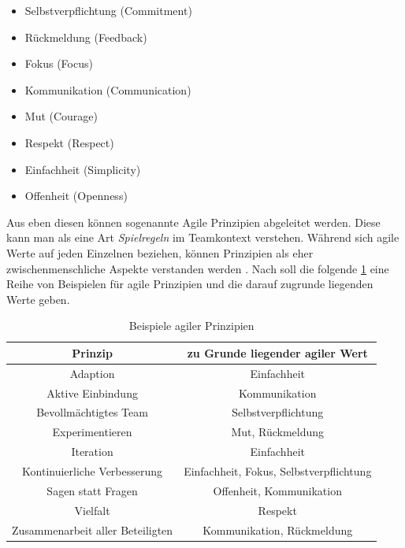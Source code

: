 \begin{itemize}[noitemsep, topsep=0pt]
	\item Selbstverpflichtung (Commitment)
	\item Rückmeldung (Feedback)
	\item Fokus (Focus)
	\item Kommunikation (Communication) 
	\item Mut (Courage)
	\item Respekt (Respect)
	\item Einfachheit (Simplicity)
	\item Offenheit (Openness)
\end{itemize}

Aus eben diesen können sogenannte Agile Prinzipien abgeleitet werden. Diese kann man als eine Art \textit{Spielregeln} im Teamkontext verstehen. Während sich agile Werte auf jeden Einzelnen beziehen, können Prinzipien als eher zwischenmenschliche Aspekte verstanden werden \cite[S. 12]{hofert_agiler_2016}. Nach  soll die folgende \ref{tab:agileprinzipien} eine Reihe von Beispielen für agile Prinzipien und die darauf zugrunde liegenden Werte geben.

\begin{table}[htbp]
	\caption{Beispiele agiler Prinzipien}
	\begin{center}
			\begin{tabular}{|c|c|}
				\hline
				\textbf{Prinzip} & \textbf{zu Grunde liegender agiler Wert}\\
				\hline
				Adaption & Einfachheit \\
				Aktive Einbindung & Kommunikation\\
				Bevollmächtigtes Team & Selbstverpflichtung \\
				Experimentieren & Mut, Rückmeldung \\
				Iteration &  Einfachheit \\
				Kontinuierliche Verbesserung & Einfachheit, Fokus, Selbstverpflichtung \\
				Sagen statt Fragen & Offenheit, Kommunikation \\
				Vielfalt & Respekt \\
				Zusammenarbeit aller Beteiligten & Kommunikation, Rückmeldung \\
				\hline
			\end{tabular}
		\label{tab:agileprinzipien}
	\end{center}
\end{table}

